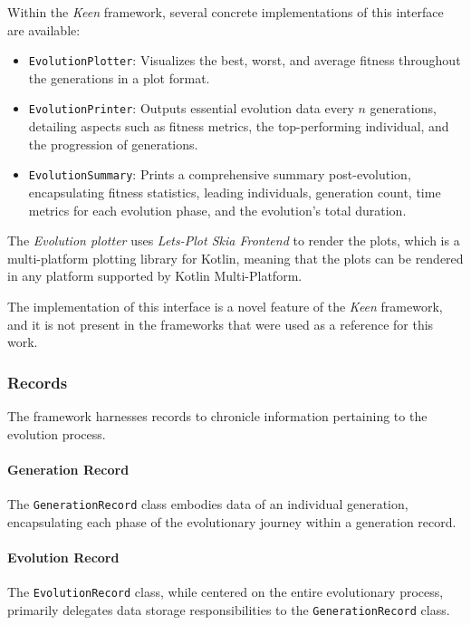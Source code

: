   Within the \textit{Keen} framework, several concrete implementations of this 
  interface are available:

  \begin{itemize}
    \item \texttt{EvolutionPlotter}: Visualizes the best, worst, and average 
      fitness throughout the generations in a plot format.
    \item \texttt{EvolutionPrinter}: Outputs essential evolution data every 
      \(n\) generations, detailing aspects such as fitness metrics, the 
      top-performing individual, and the progression of generations.
    \item \texttt{EvolutionSummary}: Prints a comprehensive summary 
      post-evolution, encapsulating fitness statistics, leading individuals, 
      generation count, time metrics for each evolution phase, and the 
      evolution's total duration.
  \end{itemize}

  \begin{remark}
    The \emph{Evolution plotter} uses \textit{Lets-Plot Skia Frontend} to render
    the plots, which is a multi-platform plotting library for Kotlin, meaning
    that the plots can be rendered in any platform supported by Kotlin 
    Multi-Platform.
  \end{remark}

  The implementation of this interface is a novel feature of the \textit{Keen}
  framework, and it is not present in the frameworks that were used as a
  reference for this work.

  \subsubsection{Records}
    The framework harnesses records to chronicle information pertaining to the 
    evolution process.

    \paragraph{Generation Record}
      The \texttt{GenerationRecord} class embodies data of an individual 
      generation, encapsulating each phase of the evolutionary journey within a 
      generation record.

    \paragraph{Evolution Record}
      The \texttt{EvolutionRecord} class, while centered on the entire 
      evolutionary process, primarily delegates data storage responsibilities 
      to the \texttt{GenerationRecord} class.
      